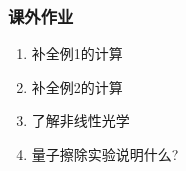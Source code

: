 %
%

\begin{frame}
    \frametitle{课外作业}
    \begin{enumerate}
        \item 补全例1的计算
        \item 补全例2的计算
        \item 了解非线性光学
        \item 量子擦除实验说明什么?
    \end{enumerate}
\end{frame}

